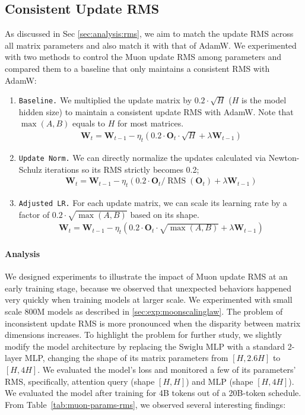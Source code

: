 \subsection{Consistent Update RMS}
\label{sec:exp:rms}

As discussed in Sec \ref{sec:analysis:rms}, we aim to match the update RMS across all matrix parameters and also match it with that of AdamW. We experimented with two methods to control the Muon update RMS among parameters and compared them to a baseline that only maintains a consistent RMS with AdamW:

\begin{enumerate}
    \item \texttt{Baseline.} We multiplied the update matrix by $0.2\cdot \sqrt{H}$ ($H$ is the model hidden size) to maintain a consistent update RMS with AdamW. Note that $\max(A,B)$ equals to $H$ for most matrices.
    \begin{align}
    \mathbf{W}_t = \mathbf{W}_{t-1} - \eta_t (0.2\cdot\mathbf{O}_t\cdot\sqrt{H} + \lambda \mathbf{W}_{t-1})
    \end{align}
    \item \texttt{Update Norm.} We can directly normalize the updates calculated via Newton-Schulz iterations so its RMS strictly becomes 0.2;
    \begin{align}
    \mathbf{W}_t = \mathbf{W}_{t-1} - \eta_t (0.2\cdot\mathbf{O}_t/\mathop{\text{RMS}}(\mathbf{O}_t) + \lambda \mathbf{W}_{t-1})
    \end{align}
    \item \texttt{Adjusted LR.} For each update matrix, we can scale its learning rate by a factor of $0.2 \cdot \sqrt{\max(A, B)}$ based on its shape. 
    \begin{align}
    \mathbf{W}_t = \mathbf{W}_{t-1} - \eta_t (0.2\cdot\mathbf{O}_t\cdot\sqrt{\max(A,B)} + \lambda \mathbf{W}_{t-1})
    \end{align}
\end{enumerate}


\paragraph{Analysis}
We designed experiments to illustrate the impact of Muon update RMS at an early training stage, because we observed that unexpected behaviors happened very quickly when training models at larger scale. We experimented with small scale 800M models as described in \ref{sec:exp:moonscalinglaw}. The problem of inconsistent update RMS is more pronounced when the disparity between matrix dimensions increases. To highlight the problem for further study, we slightly modify the model architecture by replacing the Swiglu MLP with a standard 2-layer MLP, changing the shape of its matrix parameters from $[H, 2.6H]$ to $[H, 4H]$. We evaluated the model's loss and monitored a few of its parameters' RMS, specifically, attention query (shape $[H, H]$) and MLP (shape $[H, 4H]$). We evaluated the model after training for 4B tokens out of a 20B-token schedule. From Table~\ref{tab:muon-params-rms}, we observed several interesting findings:


